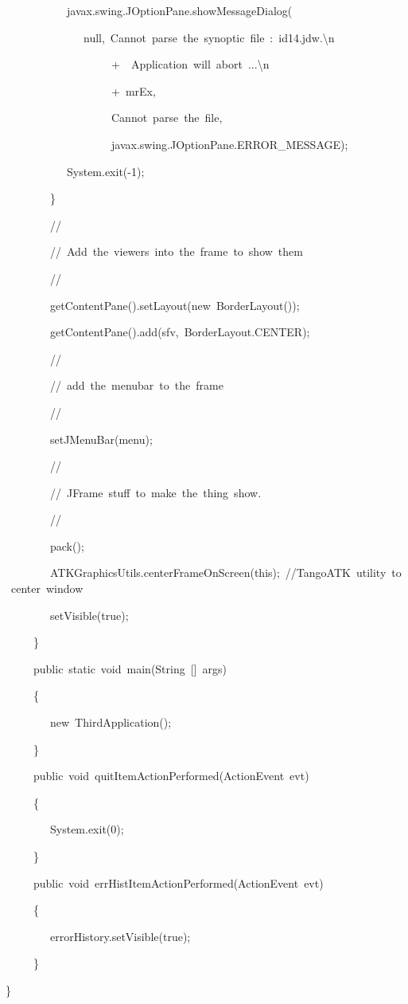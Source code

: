 \begin{lyxcode}
~~~~~~~~~~~javax.swing.JOptionPane.showMessageDialog(

~~~~~~~~~~~~~~null,~\textquotedbl{}Cannot~parse~the~synoptic~file~:~id14.jdw.\textbackslash{}n\textquotedbl{}

~~~~~~~~~~~~~~~~~~~+~\textquotedbl{}~Application~will~abort~...\textbackslash{}n\textquotedbl{}

~~~~~~~~~~~~~~~~~~~+~mrEx,

~~~~~~~~~~~~~~~~~~~\textquotedbl{}Cannot~parse~the~file\textquotedbl{},

~~~~~~~~~~~~~~~~~~~javax.swing.JOptionPane.ERROR\_MESSAGE);

~~~~~~~~~~~System.exit(-1);

~~~~~~~~\}

~~~~~~~~//

~~~~~~~~//~Add~the~viewers~into~the~frame~to~show~them

~~~~~~~~//

~~~~~~~~getContentPane().setLayout(new~BorderLayout());

~~~~~~~~getContentPane().add(sfv,~BorderLayout.CENTER);

~~~~~~~~//

~~~~~~~~//~add~the~menubar~to~the~frame

~~~~~~~~//

~~~~~~~~setJMenuBar(menu);

~~~~~~~~//

~~~~~~~~//~JFrame~stuff~to~make~the~thing~show.

~~~~~~~~//

~~~~~~~~pack();

~~~~~~~~ATKGraphicsUtils.centerFrameOnScreen(this);~//TangoATK~utility~to~center~window

~~~~~~~~setVisible(true);

~~~~~\}

~~~~~public~static~void~main(String~{[}{]}~args)

~~~~~\{

~~~~~~~~new~ThirdApplication();

~~~~~\}

~~~~~public~void~quitItemActionPerformed(ActionEvent~evt)

~~~~~\{

~~~~~~~~System.exit(0);

~~~~~\}

~~~~~public~void~errHistItemActionPerformed(ActionEvent~evt)

~~~~~\{

~~~~~~~~errorHistory.setVisible(true);

~~~~~\}

\}

~\\
~\\
\end{lyxcode}
